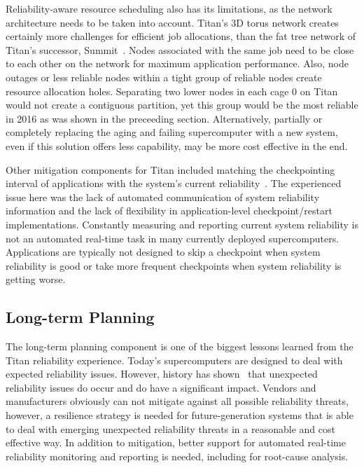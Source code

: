 Reliability-aware resource scheduling also has its limitations, as the network
architecture needs to be taken into account. Titan's 3D torus network creates
certainly more challenges for efficient job allocations, than the fat tree
network of Titan's successor, Summit~\cite{olcf:summit}. Nodes associated with
the same job need to be close to each other on the network for maximum
application performance. Also, node outages or less reliable nodes within a
tight group of reliable nodes create resource allocation
holes. Separating two lower nodes in each cage 0 on Titan would not
create a contiguous partition, yet this group would be the most
reliable in 2016 as was shown in the preceeding section.
%
Alternatively, partially or completely replacing the aging and failing
supercomputer with a new system, even if this solution offers less capability,
may be more cost effective in the end.

Other mitigation components for Titan included matching the checkpointing
interval of applications with the system's current
reliability~\cite{bautista-gomez16reducing, 6903564}. The experienced issue here
was the lack of automated communication of system reliability information and
the lack of flexibility in application-level checkpoint/restart implementations.
Constantly measuring and reporting current system reliability is not an automated
real-time task in many currently deployed supercomputers. Applications are
typically not designed to skip a checkpoint when system reliability is good or
take more frequent checkpoints when system reliability is getting worse.

\subsection{Long-term Planning}
\label{section:planning}

The long-term planning component is one of the biggest lessons learned from the
Titan reliability experience. Today's supercomputers are designed to deal with
expected reliability issues. However, history has shown~\cite{geist12kill} that
unexpected reliability issues do occur and do have a significant impact. Vendors
and manufacturers obviously can not mitigate against all possible reliability
threats, however, a resilience strategy is needed for future-generation systems
that is able to deal with emerging unexpected reliability threats in a
reasonable and cost effective way. In addition to mitigation, better support for
automated real-time reliability monitoring and reporting is needed, including
for root-cause analysis.

